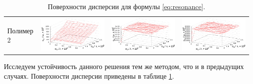 \documentclass[12pt,a4paper]{article}
\begin{document}
\begin{table}[h]
\begin{tabular}{l | c c c}
	\begin{rotate}{90}Полимер 2\end{rotate} &	\includegraphics[scale=0.4]{figs/resonance/p2.txt_coeff0.dat.eps} & \includegraphics[scale=0.4]{figs/resonance/p2.txt_coeff1.dat.eps} & \includegraphics[scale=0.4]{figs/resonance/p2.txt_coeff2.dat.eps}
  \end{tabular}
  \caption{Поверхности дисперсии для формулы \eqref{eq:resonance}.}
  \label{tabl:res_resonance}
\end{table}

Исследуем устойчивость данного решения тем же методом, что и в
предыдущих случаях. Поверхности дисперсии приведены в таблице \ref{tabl:res_resonance}.
\end{document}
